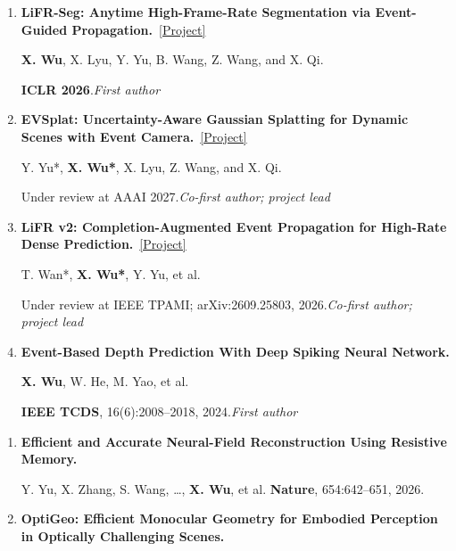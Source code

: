 \documentclass[a4paper]{article}
\newcommand{\pubgroup}[1]{%
  \par\vspace{2.0pt}{\color{cvblue}\fontsize{9.4}{10.4}\selectfont\bfseries #1}\par
}
\begin{document}
{\begin{enumerate}[leftmargin=1.6em,labelsep=0.38em,itemsep=0.4pt,topsep=1.3pt,parsep=0pt,partopsep=0pt]
\textbf{X. Wu}, Y. Yu, X. Lyu, et al.\par
\textbf{NeurIPS 2025} \textcolor{cvred}{\textbf{\textperiodcentered\ Spotlight}}.\hfill\textcolor{cvblue}{\textit{First author}}
\item \textbf{LiFR-Seg: Anytime High-Frame-Rate Segmentation via Event-Guided Propagation.}~\href{https://candy-crusher.github.io/xiaoshanwu.github.io/projects/lifr-seg/}{\textcolor{cvblue}{[Project]}}\par
\textbf{X. Wu}, X. Lyu, Y. Yu, B. Wang, Z. Wang, and X. Qi.\par
\textbf{ICLR 2026}.\hfill\textcolor{cvblue}{\textit{First author}}
\item \textbf{EVSplat: Uncertainty-Aware Gaussian Splatting for Dynamic Scenes with Event Camera.}~\href{https://candy-crusher.github.io/xiaoshanwu.github.io/projects/evsplat/}{\textcolor{cvblue}{[Project]}}\par
Y. Yu*, \textbf{X. Wu*\textdagger}, X. Lyu, Z. Wang, and X. Qi.\par
Under review at AAAI 2027.\hfill\textcolor{cvblue}{\textit{Co-first author; project lead}}
\item \textbf{LiFR v2: Completion-Augmented Event Propagation for High-Rate Dense Prediction.}~\href{https://candy-crusher.github.io/xiaoshanwu.github.io/projects/lifr-v2/}{\textcolor{cvblue}{[Project]}}\par
T. Wan*, \textbf{X. Wu*\textdagger}, Y. Yu, et al.\par
Under review at IEEE TPAMI; arXiv:2609.25803, 2026.\hfill\textcolor{cvblue}{\textit{Co-first author; project lead}}
\item \textbf{Event-Based Depth Prediction With Deep Spiking Neural Network.}\par
\textbf{X. Wu}, W. He, M. Yao, et al.\par
\textbf{IEEE TCDS}, 16(6):2008--2018, 2024.\hfill\textcolor{cvblue}{\textit{First author}}
\end{enumerate}
\pubgroup{Collaborative Work}
\begin{enumerate}[resume,leftmargin=1.6em,labelsep=0.38em,itemsep=0.4pt,topsep=1.3pt,parsep=0pt,partopsep=0pt]
\item \textbf{Efficient and Accurate Neural-Field Reconstruction Using Resistive Memory.}\par
Y. Yu, X. Zhang, S. Wang, \ldots, \textbf{X. Wu}, et al. \hfill \textbf{Nature}, 654:642--651, 2026.
\item \textbf{OptiGeo: Efficient Monocular Geometry for Embodied Perception in Optically Challenging Scenes.}\par

\end{enumerate}}
\end{document}
